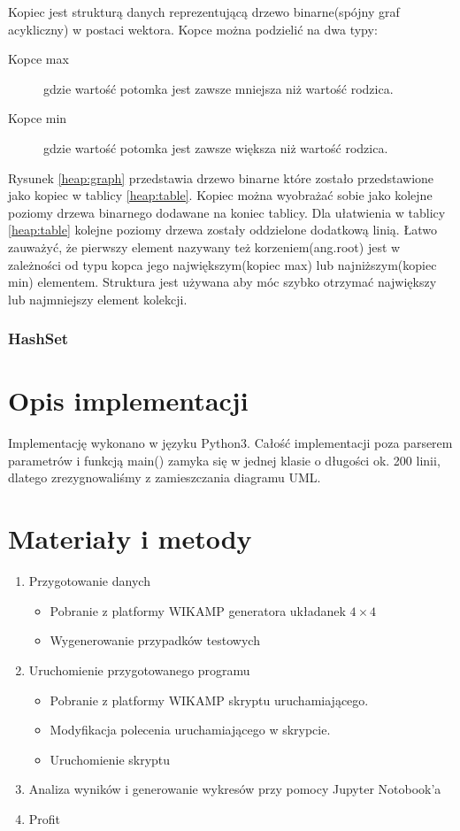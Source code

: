 \documentclass{classrep}
\begin{document}
Kopiec jest strukturą danych reprezentującą drzewo binarne(spójny graf acykliczny) w postaci wektora\cite{STLAlgsVid}.
Kopce można podzielić na dwa typy\cite{IntroToAlgs}:
\begin{description}
    \item [Kopce max] gdzie wartość potomka jest zawsze mniejsza niż wartość rodzica.
    \item [Kopce min] gdzie wartość potomka jest zawsze większa niż wartość rodzica.
\end{description}

Rysunek \ref{heap:graph} przedstawia drzewo binarne które zostało przedstawione jako kopiec w tablicy \ref{heap:table}.
Kopiec można wyobrażać sobie jako kolejne poziomy drzewa binarnego dodawane na koniec tablicy.
Dla ułatwienia w tablicy \ref{heap:table} kolejne poziomy drzewa zostały oddzielone dodatkową linią.
Łatwo zauważyć, że pierwszy element nazywany też korzeniem(ang.root) jest w zależności od typu kopca jego największym(kopiec max) lub najniższym(kopiec min) elementem.
Struktura jest używana aby móc szybko otrzymać największy lub najmniejszy element kolekcji\cite{STLAlgsVid}.
\subsubsection{HashSet}
\section{Opis implementacji}
Implementację wykonano w języku Python3. 
Całość implementacji poza parserem parametrów i funkcją main() zamyka się w jednej klasie o długości ok. 200 linii, dlatego zrezygnowaliśmy z zamieszczania diagramu UML.

\section{Materiały i metody}

\begin{enumerate}
    \item  Przygotowanie danych
        \begin{itemize}
            \item Pobranie z platformy WIKAMP generatora układanek $4\times 4$
            \item Wygenerowanie przypadków testowych
        \end{itemize}
    \item Uruchomienie przygotowanego programu
        \begin{itemize}
            \item Pobranie z platformy WIKAMP skryptu uruchamiającego.
            \item Modyfikacja polecenia uruchamiającego w skrypcie.
            \item Uruchomienie skryptu
        \end{itemize}
    \item Analiza wyników i generowanie wykresów przy pomocy Jupyter Notobook'a
    \item Profit
\end{enumerate}
\end{document}
